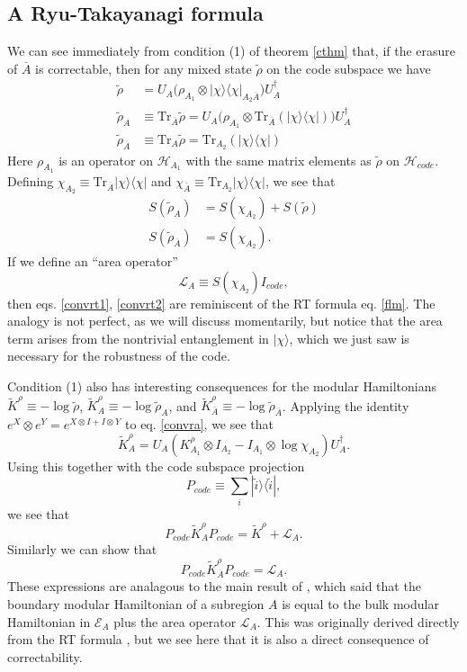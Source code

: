 \documentclass[12pt]{article}
\newcommand{\be}{\begin{equation}}
\newcommand{\ee}{\end{equation}}
\newcommand{\lan}{\langle}
\newcommand{\ran}{\rangle}
\newcommand{\Tr}{\mathrm{Tr}}
\newcommand{\wt}{\widetilde}
\newcommand{\Ll}{\mathcal{L}}
\newcommand{\Ab}{\ol{A}}
\newcommand{\Hc}{\mathcal{H}_{code}}
\newcommand{\ol}{\overline}
\newcommand{\EA}{\mathcal{E}_A}
\newcommand{\Pc}{P_{code}}
\begin{document}
\subsection{A Ryu-Takayanagi formula}
We can see immediately from condition (1) of theorem \ref{cthm} that, if the erasure of $\Ab$ is correctable, then for any mixed state $\wt{\rho}$ on the code subspace we have
\begin{align}
\wt{\rho}&=U_A\Big(\rho_{A_1}\otimes |\chi\ran\lan\chi|_{A_2\Ab}\Big)U_A^\dagger\\\label{convra}
\wt{\rho}_A&\equiv \Tr_{\Ab}\wt{\rho}=U_A\Big(\rho_{A_1}\otimes \Tr_{\Ab}\left(|\chi\ran\lan \chi|\right)\Big)U_A^\dagger\\
\wt{\rho}_{\Ab}&\equiv \Tr_{A}\wt{\rho}=\Tr_{A_2}\left(|\chi\ran\lan \chi|\right)
\end{align}
Here $\rho_{A_1}$ is an operator on $\mathcal{H}_{A_1}$ with the same matrix elements as $\wt{\rho}$ on $\Hc$.  Defining $\chi_{A_2}\equiv \Tr_{\Ab}|\chi\ran\lan\chi|$ and $\chi_{\Ab}\equiv \Tr_{A_2}|\chi\ran\lan\chi|$, we see that
\begin{align}\label{convrt1}
S\left(\wt{\rho}_A\right)&=S\left(\chi_{A_2}\right)+S(\wt{\rho})\\\label{convrt2}
S\left(\wt{\rho}_{\Ab}\right)&=S\left(\chi_{A_2}\right).
\end{align}
If we define an ``area operator''
\be
\Ll_A\equiv S\left(\chi_{A_2}\right) I_{code},
\ee 
then eqs. \eqref{convrt1}, \eqref{convrt2} are reminiscent of the RT formula eq. \eqref{flm}.  The analogy is not perfect, as we will discuss momentarily, but notice that the area term arises from the nontrivial entanglement in $|\chi\ran$, which we just saw is necessary for the robustness of the code.

Condition (1) also has interesting consequences for the modular Hamiltonians $\wt{K}^\rho\equiv -\log \wt{\rho}$, $\wt{K}^\rho_A\equiv -\log \wt{\rho}_A$, and $\wt{K}^\rho_{\Ab}\equiv -\log \wt{\rho}_{\Ab}$.  Applying the identity $e^X\otimes e^Y=e^{X\otimes I+I\otimes Y}$ to eq. \eqref{convra}, we see that 
\be
\wt{K}^\rho_A=U_A\left(K_{A_1}^\rho\otimes I_{A_2}-I_{A_1}\otimes \log \chi_{A_2}\right)U_A^\dagger.
\ee
Using this together with the code subspace projection
\be
\Pc \equiv \sum_i|\wt{i}\ran\lan\wt{i}|,
\ee
we see that
\be\label{cjlms1}
\Pc\wt{K}^\rho_A \Pc=\wt{K}^\rho+\Ll_A.
\ee
Similarly we can show that
\be\label{cjlms2}
\Pc\wt{K}^\rho_{\Ab}\Pc=\Ll_A.
\ee
These expressions are analagous to the main result of \cite{Jafferis:2015del}, which said that the boundary modular Hamiltonian of a subregion $A$ is equal to the bulk modular Hamiltonian in $\EA$ plus the area operator $\Ll_A$.  This was originally derived directly from the RT formula \cite{Jafferis:2015del,Dong:2016eik}, but we see here that it is also a direct consequence of correctability. 
 
\end{document}
